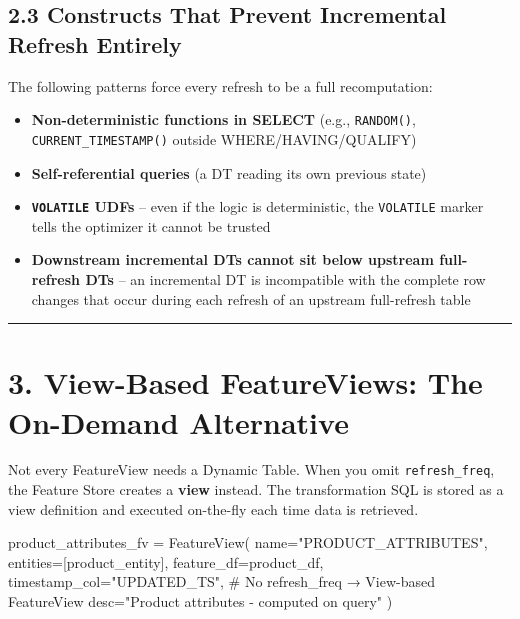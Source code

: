 \documentclass[
  letterpaper,
  DIV=11,
  numbers=noendperiod]{scrreprt}
\newenvironment{Shaded}{\begin{snugshade}}{\end{snugshade}}
\newcommand{\CommentTok}[1]{\textcolor[rgb]{0.37,0.37,0.37}{#1}}
\newcommand{\NormalTok}[1]{\textcolor[rgb]{0.00,0.23,0.31}{#1}}
\newcommand{\OperatorTok}[1]{\textcolor[rgb]{0.37,0.37,0.37}{#1}}
\newcommand{\StringTok}[1]{\textcolor[rgb]{0.13,0.47,0.30}{#1}}
\providecommand{\tightlist}{%
  \setlength{\itemsep}{0pt}\setlength{\parskip}{0pt}}\usepackage{longtable,booktabs,array}
\begin{document}
\hypertarget{constructs-that-prevent-incremental-refresh-entirely}{%
\subsection{2.3 Constructs That Prevent Incremental Refresh
Entirely}\label{constructs-that-prevent-incremental-refresh-entirely}}

The following patterns force every refresh to be a full recomputation:

\begin{itemize}
\tightlist
\item
  \textbf{Non-deterministic functions in SELECT} (e.g.,
  \texttt{RANDOM()}, \texttt{CURRENT\_TIMESTAMP()} outside
  WHERE/HAVING/QUALIFY)
\item
  \textbf{Self-referential queries} (a DT reading its own previous
  state)
\item
  \textbf{\texttt{VOLATILE} UDFs} -- even if the logic is deterministic,
  the \texttt{VOLATILE} marker tells the optimizer it cannot be trusted
\item
  \textbf{Downstream incremental DTs cannot sit below upstream
  full-refresh DTs} -- an incremental DT is incompatible with the
  complete row changes that occur during each refresh of an upstream
  full-refresh table
\end{itemize}

\begin{center}\rule{0.5\linewidth}{0.5pt}\end{center}

\hypertarget{view-based-featureviews-the-on-demand-alternative}{%
\section{3. View-Based FeatureViews: The On-Demand
Alternative}\label{view-based-featureviews-the-on-demand-alternative}}

Not every FeatureView needs a Dynamic Table. When you omit
\texttt{refresh\_freq}, the Feature Store creates a \textbf{view}
instead. The transformation SQL is stored as a view definition and
executed on-the-fly each time data is retrieved.

\begin{Shaded}
\begin{Highlighting}[]
\NormalTok{product\_attributes\_fv }\OperatorTok{=}\NormalTok{ FeatureView(}
\NormalTok{    name}\OperatorTok{=}\StringTok{"PRODUCT\_ATTRIBUTES"}\NormalTok{,}
\NormalTok{    entities}\OperatorTok{=}\NormalTok{[product\_entity],}
\NormalTok{    feature\_df}\OperatorTok{=}\NormalTok{product\_df,}
\NormalTok{    timestamp\_col}\OperatorTok{=}\StringTok{"UPDATED\_TS"}\NormalTok{,}
    \CommentTok{\# No refresh\_freq → View{-}based FeatureView}
\NormalTok{    desc}\OperatorTok{=}\StringTok{"Product attributes {-} computed on query"}
\NormalTok{)}
\end{Highlighting}
\end{Shaded}
\end{document}
